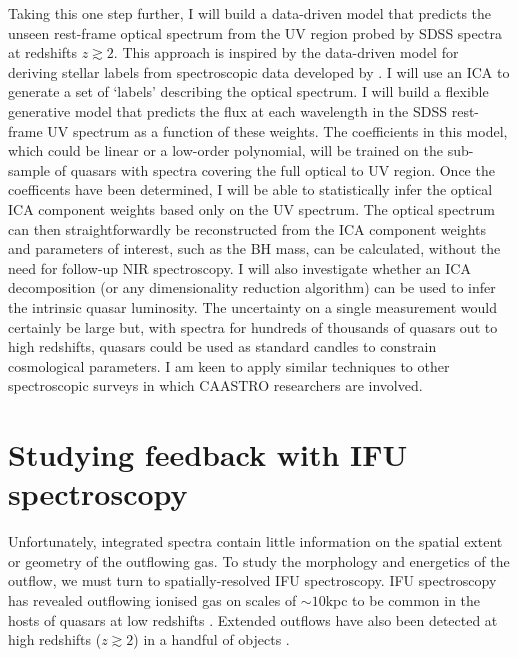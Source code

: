 Taking this one step further, I will build a data-driven model that predicts the unseen rest-frame optical spectrum from the UV region probed by SDSS spectra at redshifts $z\gtrsim2$.
This approach is inspired by the data-driven model for deriving stellar labels from spectroscopic data developed by \citet{ness15}.
I will use an ICA to generate a set of `labels' describing the optical spectrum. 
I will build a flexible generative model that predicts the flux at each wavelength in the SDSS rest-frame UV spectrum as a function of these weights.
The coefficients in this model, which could be linear or a low-order polynomial, will be trained on the sub-sample of quasars with spectra covering the full optical to UV region. 
Once the coefficents have been determined, I will be able to statistically infer the optical ICA component weights based only on the UV spectrum. 
The optical spectrum can then straightforwardly be reconstructed from the ICA component weights and parameters of interest, such as the BH mass, can be calculated, without the need for follow-up NIR spectroscopy. 
I will also investigate whether an ICA decomposition (or any dimensionality reduction algorithm) can be used to infer the intrinsic quasar luminosity. 
The uncertainty on a single measurement would certainly be large but, with spectra for hundreds of thousands of quasars out to high redshifts, quasars could be used as standard candles to constrain cosmological parameters. 
I am keen to apply similar techniques to other spectroscopic surveys in which CAASTRO researchers are involved. 






\section{Studying feedback with IFU spectroscopy}

Unfortunately, integrated spectra contain little information on the spatial extent or geometry of the outflowing gas.  
To study the morphology and energetics of the outflow, we must turn to spatially-resolved IFU spectroscopy.
IFU spectroscopy has revealed outflowing ionised gas on scales of $\sim10$kpc to be common in the hosts of quasars at low redshifts \citep[e.g.][]{harrison14}. 
Extended outflows have also been detected at high redshifts ($z\gtrsim2$) in a handful of objects \citep[e.g.][]{carniani15}. 

